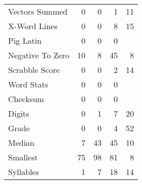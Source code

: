 \documentclass{sig-alternate}
\begin{document}
\begin{table}[t]
\begin{tabular}{lrrr|r}
Vectors Summed             & 0       & 0   & 1        & 11   \\
X-Word Lines               & 0       & 0   & 8        & 15   \\
Pig Latin                  & 0       & 0   & 0        &     \\
Negative To Zero           & 10      & 8   & 45       & 8    \\
Scrabble Score             & 0       & 0   & 2        & 14   \\
Word Stats                 & 0       & 0   & 0        &     \\
Checksum                   & 0       & 0   & 0        &     \\
Digits                     & 0       & 1   & 7        & 20   \\
Grade                      & 0       & 0   & 4        & 52   \\
Median                     & 7       & 43  & 45       & 10   \\
Smallest                   & 75      & 98  & 81       & 8    \\
Syllables                  & 1       & 7   & 18       & 14   \\

\end{tabular}
\end{table}
\end{document}
